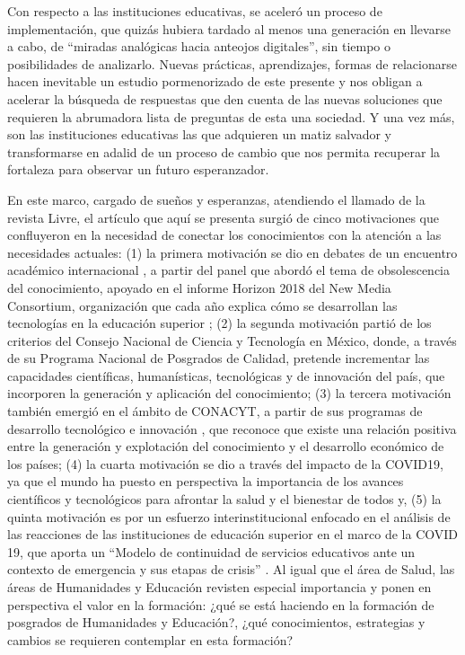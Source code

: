 \documentclass{textolivre}
\begin{document}
Con respecto a las instituciones educativas, se aceleró un proceso de implementación, que quizás hubiera tardado al menos una generación en llevarse a cabo,  de “miradas analógicas hacia anteojos digitales”, sin tiempo o posibilidades de analizarlo. Nuevas prácticas, aprendizajes, formas de relacionarse hacen inevitable un estudio pormenorizado de este presente y nos obligan a acelerar la búsqueda de respuestas que den cuenta de las nuevas soluciones que requieren la abrumadora lista de preguntas de esta una sociedad. Y una vez más, son las instituciones educativas las que adquieren un matiz salvador y transformarse en adalid de un proceso de cambio que nos permita recuperar la fortaleza para observar un futuro esperanzador.

En este marco, cargado de sueños y esperanzas, atendiendo el llamado de la revista Livre, el artículo que aquí se presenta surgió de cinco motivaciones que confluyeron en la necesidad de conectar los conocimientos con la atención a las necesidades actuales: (1) la primera motivación se dio en debates de un encuentro académico internacional \cite{carrera_educacion_2018}, a partir del panel que abordó el tema de obsolescencia del conocimiento, apoyado en el informe Horizon 2018 del New Media Consortium, organización que cada año explica cómo se desarrollan las tecnologías en la educación superior \cite{the_new_media_consortium-_horizon_report_horizon_2018};  (2)  la segunda motivación partió de los criterios del Consejo Nacional de Ciencia y Tecnología \cite{consejo_nacional_de_ciencia_y_tecnologia_conacyt_programa2020a} en México, donde, a través de su Programa Nacional de Posgrados de Calidad, pretende incrementar las capacidades científicas, humanísticas, tecnológicas y de innovación del país, que incorporen la generación y aplicación del conocimiento; (3)  la tercera motivación también emergió en el ámbito de CONACYT, a partir de sus programas de desarrollo tecnológico e innovación \cite{consejo_nacional_de_ciencia_y_tecnologia_conacyt_desarrollo_2020b}, que reconoce que existe una relación positiva entre la generación y explotación del conocimiento y el desarrollo económico de los países; (4) la cuarta motivación se dio a través del impacto de la COVID19, ya que el mundo ha puesto en perspectiva la importancia de los avances científicos y tecnológicos para afrontar la salud y el bienestar de todos y, (5) la quinta motivación es por un esfuerzo interinstitucional enfocado en el análisis de las reacciones de las instituciones de educación superior en el marco de la COVID 19, que aporta un “Modelo de continuidad de servicios educativos ante un contexto de emergencia y sus etapas de crisis” \cite{vicario-solorzano_modelo_2021}. Al igual que el área de Salud, las áreas de Humanidades y Educación revisten especial importancia y ponen en perspectiva el valor en la formación: ¿qué se está haciendo en la formación de posgrados de Humanidades y Educación?, ¿qué conocimientos, estrategias y cambios se requieren contemplar en esta formación?
\end{document}

